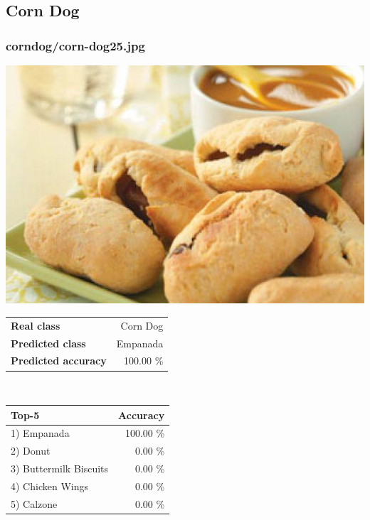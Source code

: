 \subsection{Corn Dog}
    
\subsubsection{corn\textunderscore dog/corn-dog25.jpg}

\begin{minipage}[t]{0.4\textwidth}
	\vspace{0pt}
	\includegraphics[width=\linewidth]{images/evaluation-images/corn_dog/corn-dog25.jpg}
\end{minipage}
\hfill
\begin{minipage}[t]{0.5\textwidth}
	\vspace{0pt}\raggedright
	\begin{tabularx}{\textwidth}{X r}
		\small \textbf{Real class} & \small Corn Dog\\
		\small \textbf{Predicted class} & \small Empanada\\
		\small \textbf{Predicted accuracy} & \small 100.00 \%
    \end{tabularx}\\
    
    \vspace{6pt}
	\begin{tabularx}{\textwidth}{X r}
        \small \textbf{Top-5} & \small \textbf{Accuracy} \\
        \hline
		\small 1) Empanada & \small 100.00 \%\\\small 2) Donut & \small 0.00 \%\\\small 3) Buttermilk Biscuits & \small 0.00 \%\\\small 4) Chicken Wings & \small 0.00 \%\\\small 5) Calzone & \small 0.00 \%
    \end{tabularx}
\end{minipage}
    
